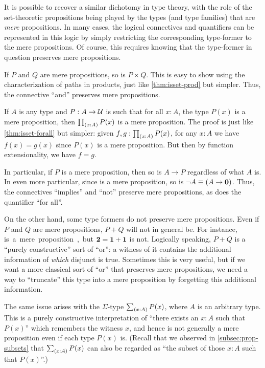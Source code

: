 It is possible to recover a similar dichotomy in type theory, with the role of the set-theoretic propositions being played by the types (and type families) that are \emph{mere} propositions.
In many cases, the logical connectives and quantifiers can be represented in this logic by simply restricting the corresponding type-former to the mere propositions.
Of course, this requires knowing that the type-former in question preserves mere propositions.

\begin{eg}
  If $P$ and $Q$ are mere propositions, so is $P\times Q$.
  This is easy to show using the characterization of paths in products, just like \cref{thm:isset-prod} but simpler.
  Thus, the connective ``and'' preserves mere propositions.
\end{eg}

\begin{eg}\label{thm:isprop-forall}
  If $A$ is any type and $P:A\to \mathcal{U}$ is such that for all $x:A$, the type $P(x)$ is a mere proposition, then $\prd{x:A} P(x)$ is a mere proposition.
  The proof is just like \cref{thm:isset-forall} but simpler: given $f,g:\prd{x:A} P(x)$, for any $x:A$ we have $f(x)=g(x)$ since $P(x)$ is a mere proposition.
  But then by function extensionality, we have $f=g$.

  In particular, if $P$ is a mere proposition, then so is $A\to P$ regardless of what $A$ is.
  In even more particular, since \emptyt is a mere proposition, so is $\neg A \equiv (A\to\mathbf{0})$.
  Thus, the connectives ``implies'' and ``not'' preserve mere propositions, as does the quantifier ``for all''.
\end{eg}

On the other hand, some type formers do not preserve mere propositions.
Even if $P$ and $Q$ are mere propositions, $P+Q$ will not in general be.
For instance, \unit is a mere proposition, but $\mathbf{2}=\mathbf{1}+\mathbf{1}$ is not.
Logically speaking, $P+Q$ is a ``purely constructive'' sort of ``or'': a witness of it contains the additional information of \emph{which} disjunct is true.
Sometimes this is very useful, but if we want a more classical sort of ``or'' that preserves mere propositions, we need a way to ``truncate'' this type into a mere proposition by forgetting this additional information.

%
The same issue arises with the $\Sigma$-type $\sm{x:A} P(x)$, where $A$ is an arbitrary type.
This is a purely constructive interpretation of ``there exists an $x:A$ such that $P(x)$'' which remembers the witness $x$, and hence is not generally a mere proposition even if each type $P(x)$ is.
(Recall that we observed in \cref{subsec:prop-subsets} that $\sm{x:A} P(x)$ can also be regarded as ``the subset of those $x:A$ such that $P(x)$''.)


